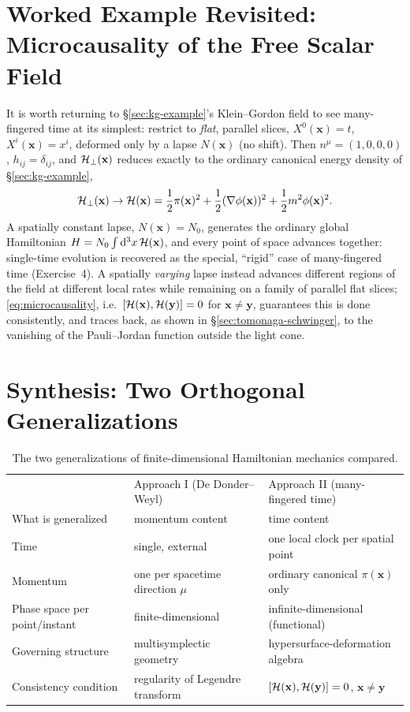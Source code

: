 \section{Worked Example Revisited: Microcausality of the Free Scalar Field}

It is worth returning to \S\ref{sec:kg-example}'s Klein--Gordon field to see many-fingered time at its simplest: restrict to \emph{flat}, parallel slices, $X^0(\mathbf{x})=t$, $X^i(\mathbf{x})=x^i$, deformed only by a lapse $N(\mathbf{x})$ (no shift). Then $n^\mu=(1,0,0,0)$, $h_{ij}=\delta_{ij}$, and $\mathcal{H}_\perp(\mathbf{x})$ reduces exactly to the ordinary canonical energy density of \S\ref{sec:kg-example},
\begin{equation}
\mathcal{H}_\perp(\mathbf{x}) \to \mathcal{H}(\mathbf{x}) = \frac{1}{2}\pi(\mathbf{x})^2 + \frac{1}{2}(\nabla\phi(\mathbf{x}))^2 + \frac{1}{2}m^2\phi(\mathbf{x})^2 .
\end{equation}
A spatially constant lapse, $N(\mathbf{x})=N_0$, generates the ordinary global Hamiltonian $H=N_0\int\mathrm{d}^3x\,\mathcal{H}(\mathbf{x})$, and every point of space advances together: single-time evolution is recovered as the special, ``rigid'' case of many-fingered time (Exercise~4). A spatially \emph{varying} lapse instead advances different regions of the field at different local rates while remaining on a family of parallel flat slices; \eqref{eq:microcausality}, i.e.\ $[\mathcal{H}(\mathbf{x}),\mathcal{H}(\mathbf{y})]=0$ for $\mathbf{x}\neq\mathbf{y}$, guarantees this is done consistently, and traces back, as shown in \S\ref{sec:tomonaga-schwinger}, to the vanishing of the Pauli--Jordan function outside the light cone.

\section{Synthesis: Two Orthogonal Generalizations}
\label{sec:synthesis}

\begin{table}[h]
\centering
\begin{tabular}{@{}lll@{}}
 & Approach I (De Donder--Weyl) & Approach II (many-fingered time) \\
What is generalized & momentum content & time content \\
Time & single, external & one local clock per spatial point \\
Momentum & one per spacetime direction $\mu$ & ordinary canonical 
    $\pi(\mathbf{x})$ only \\
Phase space per point/instant & finite-dimensional & 
    infinite-dimensional (functional) \\
Governing structure & multisymplectic geometry & 
    hypersurface-deformation algebra \\
Consistency condition & regularity of Legendre transform & 
    $[\mathcal{H}(\mathbf{x}),\mathcal{H}(\mathbf{y})]=0$, $\mathbf{x}\neq\mathbf{y}$ \\
\end{tabular}
\caption{The two generalizations of finite-dimensional 
    Hamiltonian mechanics compared.}
\end{table}

